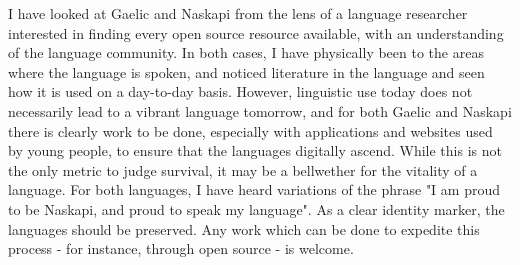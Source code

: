 I have looked at Gaelic and Naskapi from the lens of a language researcher interested in finding every open source resource available, with an understanding of the language community. In both cases, I have physically been to the areas where the language is spoken, and noticed literature in the language and seen how it is used on a day-to-day basis. However, linguistic use today does not necessarily lead to a vibrant language tomorrow, and for both Gaelic and Naskapi there is clearly work to be done, especially with applications and websites used by young people, to ensure that the languages digitally ascend. While this is not the only metric to judge survival, it may be a bellwether for the vitality of a language. For both languages, I have heard variations of the phrase "I am proud to be Naskapi, and proud to speak my language". As a clear identity marker, the languages should be preserved. Any work which can be done to expedite this process - for instance, through open source - is welcome. 
